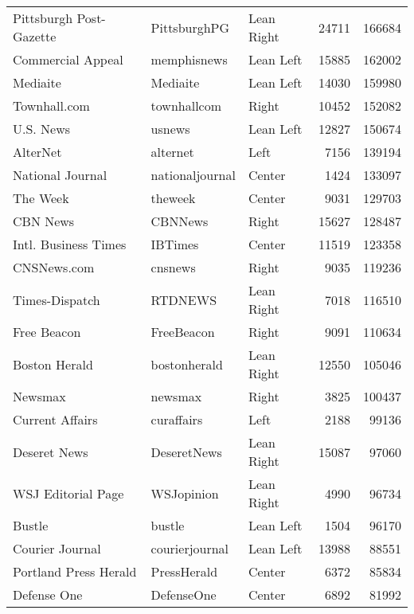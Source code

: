 \begin{tabular}{lllrr}
 Pittsburgh Post-Gazette &     PittsburghPG &    Lean Right &             24711 &     166684 \\
       Commercial Appeal &      memphisnews &     Lean Left &             15885 &     162002 \\
                Mediaite &         Mediaite &     Lean Left &             14030 &     159980 \\
            Townhall.com &      townhallcom &         Right &             10452 &     152082 \\
               U.S. News &           usnews &     Lean Left &             12827 &     150674 \\
                AlterNet &         alternet &          Left &              7156 &     139194 \\
        National Journal &  nationaljournal &        Center &              1424 &     133097 \\
                The Week &          theweek &        Center &              9031 &     129703 \\
                CBN News &          CBNNews &         Right &             15627 &     128487 \\
    Intl. Business Times &          IBTimes &        Center &             11519 &     123358 \\
             CNSNews.com &          cnsnews &         Right &              9035 &     119236 \\
          Times-Dispatch &          RTDNEWS &    Lean Right &              7018 &     116510 \\
             Free Beacon &       FreeBeacon &         Right &              9091 &     110634 \\
           Boston Herald &     bostonherald &    Lean Right &             12550 &     105046 \\
                 Newsmax &          newsmax &         Right &              3825 &     100437 \\
         Current Affairs &       curaffairs &          Left &              2188 &      99136 \\
            Deseret News &      DeseretNews &    Lean Right &             15087 &      97060 \\
      WSJ Editorial Page &       WSJopinion &    Lean Right &              4990 &      96734 \\
                  Bustle &           bustle &     Lean Left &              1504 &      96170 \\
         Courier Journal &   courierjournal &     Lean Left &             13988 &      88551 \\
   Portland Press Herald &      PressHerald &        Center &              6372 &      85834 \\
             Defense One &       DefenseOne &        Center &              6892 &      81992 \\
\bottomrule
\end{tabular}
